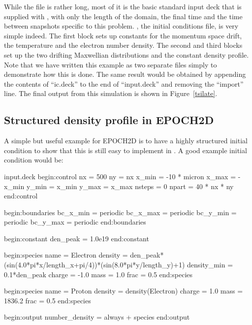 
While the  file is rather long, most of it is the basic
standard input deck that is supplied with {\EPOCH}, with only the length of the
domain, the final time and the time between snapshots specific to this
problem. , the initial conditions file, is very simple
indeed. The first block sets up constants for the momentum space drift, the
temperature and the electron number density. The second and third blocks set up
the two drifting Maxwellian distributions and the constant density profile.
Note that we have written this example as two separate files simply
to demonstrate how this is done. The
same result would be obtained by appending the contents of ``ic.deck'' to
the end of ``input.deck'' and removing the ``import'' line.
The final output from this simulation is shown in Figure~\ref{tsilate}.

\subsection{Structured density profile in EPOCH2D}


A simple but useful example for EPOCH2D is to have a highly structured initial
condition to show that this is still easy to implement in {\EPOCH}. A good
example initial condition would be:
\begin{lboxverbatim2}{input.deck}
begin:control
   nx = 500
   ny = nx
   x_min = -10 * micron
   x_max = -x_min
   y_min = x_min
   y_max = x_max
   nsteps = 0
   npart = 40 * nx * ny
end:control

begin:boundaries
   bc_x_min = periodic
   bc_x_max = periodic
   bc_y_min = periodic
   bc_y_max = periodic
end:boundaries

begin:constant
   den_peak = 1.0e19
end:constant

begin:species
   name = Electron
   density = den_peak*(sin(4.0*pi*x/length_x+pi/4))*(sin(8.0*pi*y/length_y)+1)
   density_min = 0.1*den_peak
   charge = -1.0
   mass = 1.0
   frac = 0.5
end:species

begin:species
   name = Proton
   density = density(Electron)
   charge = 1.0
   mass = 1836.2
   frac = 0.5
end:species

begin:output
   number_density = always + species
end:output
\end{lboxverbatim2}

